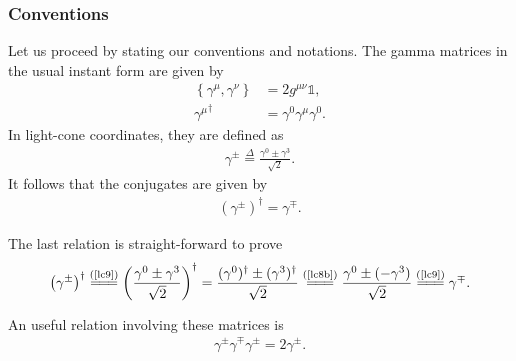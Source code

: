 \subsubsection*{\sffamily Conventions}
Let us proceed by stating our conventions and notations. The gamma matrices in the usual instant form are given by
\begin{subequations}
\begin{align}
\left\lbrace\gamma^\mu,\gamma^\nu\right\rbrace&=2g^{\mu\nu}\mathds{1},\label{lc8a}%
\\
{\gamma^\mu}^\dag&=\gamma^0\gamma^\mu\gamma^0 \label{lc8b}.
\end{align}
\end{subequations}
In light-cone coordinates, they are defined as
\begin{align}
\label{lc9}
\gamma^\pm\overset{\Delta}{=}\frac{\gamma^0\pm\gamma^3}{\sqrt{2}}.
\end{align}
It follows that the conjugates are given by
\begin{align}
\label{lc13}
\left(\gamma^\pm\right)^\dag=\gamma^\mp.
\end{align}


\begin{note}\noindent
The last relation is straight-forward to prove
\begin{align*}
\left(\gamma^\pm\right)^\dag\stackrel{(\text{\cref{lc9}})}{=\joinrel=\joinrel=}\left(\frac{\gamma^0\pm\gamma^3}{\sqrt{2}}\right)^\dag=\frac{(\gamma^0)^\dag\pm(\gamma^3)^\dag}{\sqrt{2}}\stackrel{(\text{\cref{lc8b}})}{=\joinrel=\joinrel=}\frac{\gamma^0\pm(-\gamma^3)}{\sqrt{2}}\stackrel{(\text{\cref{lc9}})}{=\joinrel=\joinrel=}\gamma^\mp.
\end{align*}
\end{note}
\noindent
An useful relation involving these matrices is
\begin{align}
\label{lc10}
\gamma^\pm\gamma^\mp\gamma^\pm=2\gamma^\pm.
\end{align}

